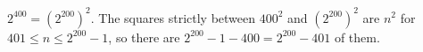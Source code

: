 $2^{400}=(2^{200})^2$. The squares strictly between $400^2$ and $(2^{200})^2$ are $n^2$ for $401\le n\le2^{200}-1$, so there are $2^{200}-1-400=\boxed{2^{200}-401}$ of them.

